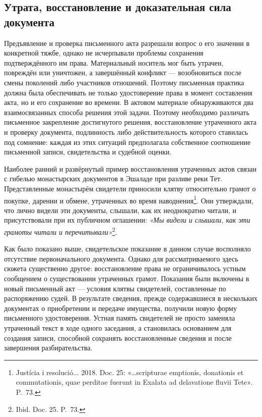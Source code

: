 \subsection{Утрата, восстановление и доказательная сила документа}

Предъявление и проверка письменного акта разрешали вопрос о его значении в конкретной тяжбе, однако не исчерпывали проблемы сохранения подтверждённого им права. Материальный носитель мог быть утрачен, повреждён или уничтожен, а завершённый конфликт --- возобновиться после смены поколений либо участников отношений. Поэтому письменная практика должна была обеспечивать не только удостоверение права в момент составления акта, но и его сохранение во времени. В актовом материале обнаруживаются два взаимосвязанных способа решения этой задачи. Поэтому необходимо различать письменное закрепление достигнутого решения, восстановление утраченного акта и проверку документа, подлинность либо действительность которого ставилась под сомнение: каждая из этих ситуаций предполагала собственное соотношение письменной записи, свидетельства и судебной оценки.

Наиболее ранний и развёрнутый пример восстановления утраченных актов связан с гибелью монастырских документов в Эшаладе при разливе реки Тет. Представленные монастырём свидетели приносили клятву относительно грамот о покупке, дарении и обмене, утраченных во время наводнения\footnote{Justícia i resolució... 2018. Doc. 25: «…scripturae emptionis, donationis et commutationis, quae perditae fuerunt in Exalata ad delavatione fluvii Tete». P.~73.}. Они утверждали, что лично видели эти документы, слышали, как их неоднократно читали, и присутствовали при их публичном оглашении: \emph{«Мы видели и слышали, как эти грамоты читали и перечитывали»}\footnote{Ibid. Doc. 25. P.~73.}.

Как было показано выше, свидетельское показание в данном случае восполняло отсутствие первоначального документа. Однако для рассматриваемого здесь сюжета существенно другое: восстановление права не ограничивалось устным сообщением о существовании утраченных грамот. Показания были включены в новый письменный акт --- условия клятвы свидетелей, составленные по распоряжению судей. В результате сведения, прежде содержавшиеся в нескольких документах о приобретении и передаче имущества, получили новую форму письменного удостоверения. Устная память свидетелей не просто заменяла утраченный текст в ходе одного заседания, а становилась основанием для создания записи, способной сохранять восстановленные сведения и после завершения разбирательства.

